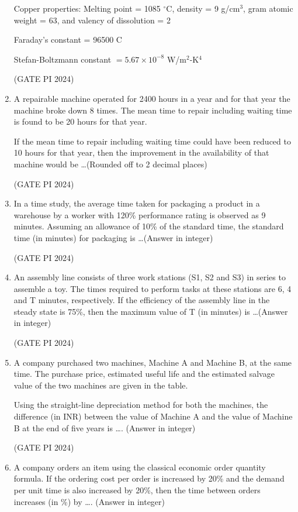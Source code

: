 \documentclass[journal,12pt,onecolumn]{IEEEtran}
\theoremstyle{remark}
\begin{document}
\begin{enumerate}
Copper properties: Melting point = 1085 $^\circ$C, density = 9 g/cm$^3$, gram atomic weight = 63, and valency of dissolution = 2

Faraday's constant = 96500 C

Stefan-Boltzmann constant $= 5.67 \times 10^{-8}$ W/m$^2$-K$^4$

\hfill (GATE PI 2024)

\item A repairable machine operated for 2400 hours in a year and for that year the machine broke down 8 times. The mean time to repair including waiting time is found to be 20 hours for that year.

If the mean time to repair including waiting time could have been reduced to 10 hours for that year, then the improvement in the availability of that machine would be \dots (Rounded off to 2 decimal places)

\hfill (GATE PI 2024)

\item In a time study, the average time taken for packaging a product in a warehouse by a worker with 120\% performance rating is observed as 9 minutes. Assuming an allowance of 10\% of the standard time, the standard time (in minutes) for packaging is \dots (Answer in integer)

\hfill (GATE PI 2024)

\item An assembly line consists of three work stations (S1, S2 and S3) in series to assemble a toy. The times required to perform tasks at these stations are 6, 4 and T minutes, respectively. If the efficiency of the assembly line in the steady state is 75\%, then the maximum value of T (in minutes) is \dots (Answer in integer)

\hfill (GATE PI 2024)


\item A company purchased two machines, Machine A and Machine B, at the same time. The purchase price, estimated useful life and the estimated salvage value of the two machines are given in the table.



Using the straight-line depreciation method for both the machines, the difference (in INR) between the value of Machine A and the value of Machine B at the end of five years is \dots . (Answer in integer)

\hfill (GATE PI 2024)

\item A company orders an item using the classical economic order quantity formula. If the ordering cost per order is increased by 20\% and the demand per unit time is also increased by 20\%, then the time between orders increases (in \%) by \dots . (Answer in integer)


\end{enumerate}
\end{document}
